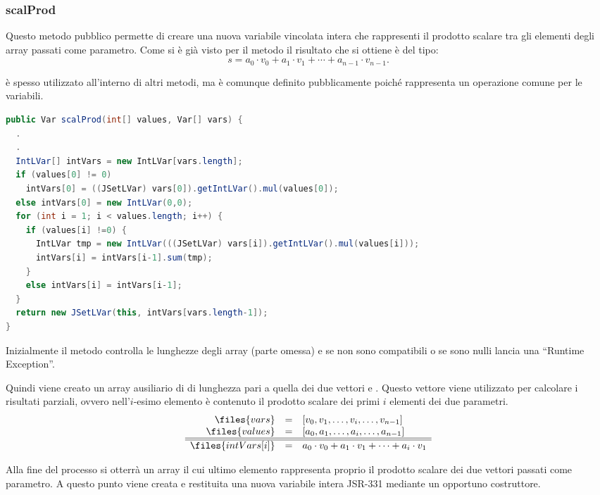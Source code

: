 \subsubsection{scalProd}
Questo metodo pubblico permette di creare una nuova variabile vincolata
intera che rappresenti il prodotto scalare tra gli elementi degli array
passati come parametro. Come si è già visto per il metodo  il
risultato che si ottiene è del tipo:
\[
s = a_0\cdot v_0 + a_1\cdot v_1 + \cdots + a_{n-1}\cdot v_{n-1}.
\]

 è spesso utilizzato all'interno di altri metodi, ma è comunque
definito pubblicamente poiché rappresenta un operazione comune per le variabili.

\begin{lstlisting}[language = Java,
                   caption = {\files{scalProd}.}]
public Var scalProd(int[] values, Var[] vars) {
  .
  .
  IntLVar[] intVars = new IntLVar[vars.length];
  if (values[0] != 0)
    intVars[0] = ((JSetLVar) vars[0]).getIntLVar().mul(values[0]);
  else intVars[0] = new IntLVar(0,0);
  for (int i = 1; i < values.length; i++) {
    if (values[i] !=0) {
      IntLVar tmp = new IntLVar(((JSetLVar) vars[i]).getIntLVar().mul(values[i]));
      intVars[i] = intVars[i-1].sum(tmp);
    }
    else intVars[i] = intVars[i-1];
  }
  return new JSetLVar(this, intVars[vars.length-1]);
}
\end{lstlisting}
Inizialmente il metodo controlla le lunghezze degli array (parte omessa) e se
non sono compatibili o se sono nulli lancia una ``Runtime Exception''.

Quindi viene creato un array ausiliario di  di lunghezza pari
a quella dei due vettori  e . Questo vettore viene
utilizzato per calcolare i risultati parziali, ovvero nell'$i$-esimo elemento
è contenuto il prodotto scalare dei primi $i$ elementi dei due parametri.
\[
\begin{array}{rcl}
\files{vars} & = & [v_0, v_1, \ldots, v_i, \ldots, v_{n-1}] \\
\files{values} & = &  [a_0, a_1, \ldots, a_i, \ldots, a_{n-1}] \\
\hline
\hline
\files{intVars[i]} & = & a_0\cdot v_0 + a_1\cdot v_1 + \cdots + a_i\cdot v_1
\end{array}
\] 

Alla fine del processo si otterrà un array il cui ultimo elemento rappresenta
proprio il prodotto scalare dei due vettori passati come parametro.
A questo punto viene creata e restituita una nuova variabile intera JSR-331
mediante un opportuno costruttore.

